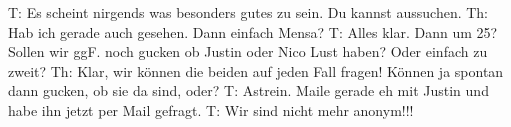 T: Es scheint nirgends was besonders gutes zu sein. Du kannst aussuchen.
Th: Hab ich gerade auch gesehen. Dann einfach Mensa? 
T: Alles klar. Dann um 25? Sollen wir ggF. noch gucken ob Justin oder Nico Lust haben? Oder einfach zu zweit?
Th: Klar, wir können die beiden auf jeden Fall fragen! Können ja spontan dann gucken, ob sie da sind, oder? 
T: Astrein. Maile gerade eh mit Justin und habe ihn jetzt per Mail gefragt. 
T: Wir sind nicht mehr anonym!!!
